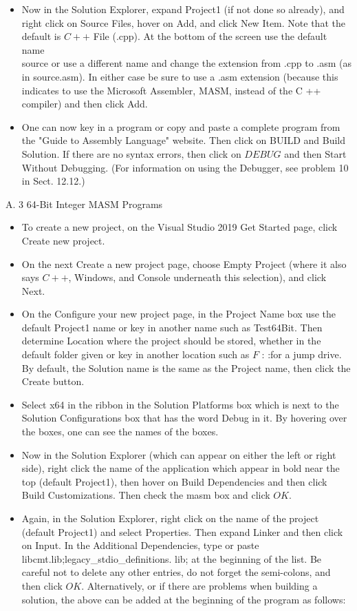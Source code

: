 \documentclass[10pt]{book}
\begin{document}
\begin{itemize}
  \item Now in the Solution Explorer, expand Project1 (if not done so already), and right click on Source Files, hover on Add, and click New Item. Note that the default is $C++$ File (.cpp). At the bottom of the screen use the default name\\
source or use a different name and change the extension from .cpp to .asm (as in source.asm). In either case be sure to use a .asm extension (because this indicates to use the Microsoft Assembler, MASM, instead of the C ++ compiler) and then click Add.
  \item One can now key in a program or copy and paste a complete program from the "Guide to Assembly Language" website. Then click on BUILD and Build Solution. If there are no syntax errors, then click on $D E B U G$ and then Start Without Debugging. (For information on using the Debugger, see problem 10 in Sect. 12.12.)
\end{itemize}

A. 3 64-Bit Integer MASM Programs
\begin{itemize}
  \item To create a new project, on the Visual Studio 2019 Get Started page, click Create new project.
  \item On the next Create a new project page, choose Empty Project (where it also says $C++$, Windows, and Console underneath this selection), and click Next.
  \item On the Configure your new project page, in the Project Name box use the default Project1 name or key in another name such as Test64Bit. Then determine Location where the project should be stored, whether in the default folder given or key in another location such as $F$ : :for a jump drive. By default, the Solution name is the same as the Project name, then click the Create button.
  \item Select x64 in the ribbon in the Solution Platforms box which is next to the Solution Configurations box that has the word Debug in it. By hovering over the boxes, one can see the names of the boxes.
  \item Now in the Solution Explorer (which can appear on either the left or right side), right click the name of the application which appear in bold near the top (default Project1), then hover on Build Dependencies and then click Build Customizations. Then check the masm box and click $O K$.
  \item Again, in the Solution Explorer, right click on the name of the project (default Project1) and select Properties. Then expand Linker and then click on Input. In the Additional Dependencies, type or paste libcmt.lib;legacy\_stdio\_definitions. lib; at the beginning of the list. Be careful not to delete any other entries, do not forget the semi-colons, and then click $O K$. Alternatively, or if there are problems when building a solution, the above can be added at the beginning of the program as follows:
\end{itemize}
\end{document}
